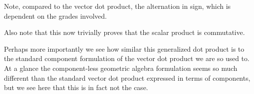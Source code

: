 Note, compared to the vector dot product, the alternation in sign, which is
dependent on the grades involved.

Also note that this now trivially proves that the scalar product is commutative.

Perhaps more importantly we see how similar this generalized dot product is to the
standard component formulation of the vector dot product we are so used to.
At a glance the component-less geometric algebra formulation seems
so much different than the standard vector dot product expressed in terms of components, but
we see here that this is in fact not the case.

